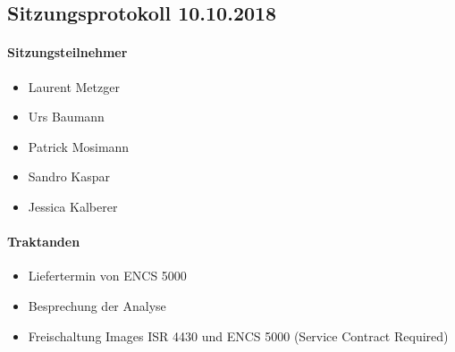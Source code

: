 \subsection{Sitzungsprotokoll 10.10.2018}

\paragraph{Sitzungsteilnehmer}
\begin{itemize}	
	\item Laurent Metzger 
	\item Urs Baumann
	\item Patrick Mosimann
	\item Sandro Kaspar
	\item Jessica Kalberer
\end{itemize}

\paragraph{Traktanden}
\begin{itemize}	
	\item Liefertermin von ENCS 5000
	\item Besprechung der Analyse
	\item Freischaltung Images ISR 4430 und ENCS 5000 (Service Contract Required)
\end{itemize}

